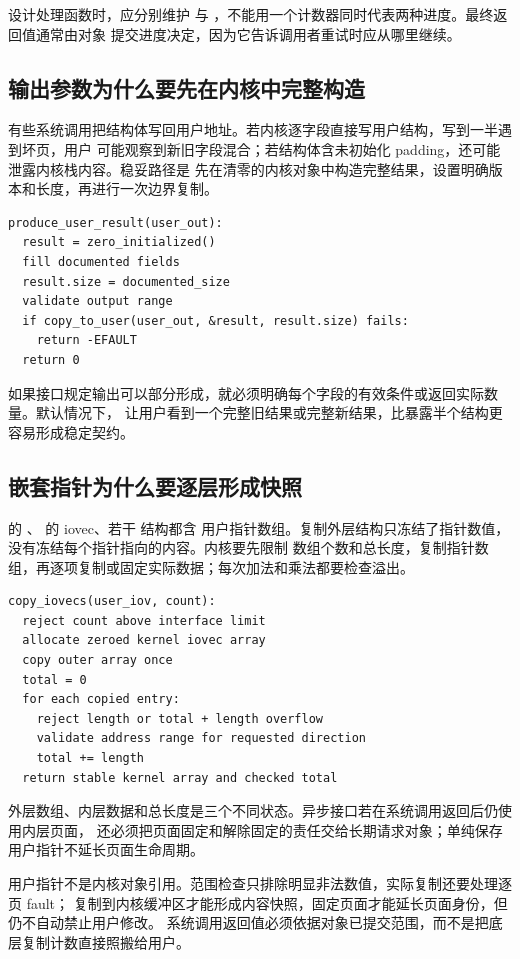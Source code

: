 设计处理函数时，应分别维护  与
，不能用一个计数器同时代表两种进度。最终返回值通常由对象
提交进度决定，因为它告诉调用者重试时应从哪里继续。

\subsection{输出参数为什么要先在内核中完整构造}

有些系统调用把结构体写回用户地址。若内核逐字段直接写用户结构，写到一半遇到坏页，用户
可能观察到新旧字段混合；若结构体含未初始化 padding，还可能泄露内核栈内容。稳妥路径是
先在清零的内核对象中构造完整结果，设置明确版本和长度，再进行一次边界复制。

\begin{lstlisting}
produce_user_result(user_out):
  result = zero_initialized()
  fill documented fields
  result.size = documented_size
  validate output range
  if copy_to_user(user_out, &result, result.size) fails:
    return -EFAULT
  return 0
\end{lstlisting}

如果接口规定输出可以部分形成，就必须明确每个字段的有效条件或返回实际数量。默认情况下，
让用户看到一个完整旧结果或完整新结果，比暴露半个结构更容易形成稳定契约。

\subsection{嵌套指针为什么要逐层形成快照}

 的 、 的 iovec、若干  结构都含
用户指针数组。复制外层结构只冻结了指针数值，没有冻结每个指针指向的内容。内核要先限制
数组个数和总长度，复制指针数组，再逐项复制或固定实际数据；每次加法和乘法都要检查溢出。

\begin{lstlisting}
copy_iovecs(user_iov, count):
  reject count above interface limit
  allocate zeroed kernel iovec array
  copy outer array once
  total = 0
  for each copied entry:
    reject length or total + length overflow
    validate address range for requested direction
    total += length
  return stable kernel array and checked total
\end{lstlisting}

外层数组、内层数据和总长度是三个不同状态。异步接口若在系统调用返回后仍使用内层页面，
还必须把页面固定和解除固定的责任交给长期请求对象；单纯保存用户指针不延长页面生命周期。

\begin{keyidea}
用户指针不是内核对象引用。范围检查只排除明显非法数值，实际复制还要处理逐页 fault；
复制到内核缓冲区才能形成内容快照，固定页面才能延长页面身份，但仍不自动禁止用户修改。
系统调用返回值必须依据对象已提交范围，而不是把底层复制计数直接照搬给用户。
\end{keyidea}

